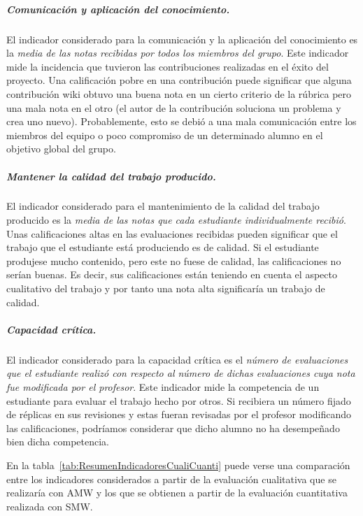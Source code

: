 			\subparagraph*{Comunicación y aplicación del conocimiento.}
			El indicador considerado para la comunicación y la aplicación del conocimiento es la \emph{media de las notas recibidas por todos los miembros del grupo}. Este indicador mide la incidencia que tuvieron las contribuciones realizadas en el éxito del proyecto. Una calificación pobre en una contribución puede significar  que alguna contribución wiki obtuvo una buena nota en un cierto criterio de la rúbrica pero una mala nota en el otro (el autor de la contribución soluciona un problema y crea uno nuevo). Probablemente, esto se debió a una mala comunicación entre los miembros del equipo o poco compromiso de un determinado alumno en el objetivo global del grupo. 

			\subparagraph*{Mantener la calidad del trabajo producido.}
			El indicador considerado para el mantenimiento de la calidad del trabajo producido es la \emph{media de las notas que cada estudiante individualmente recibió}. Unas calificaciones altas en las evaluaciones recibidas pueden significar que el trabajo que el estudiante está produciendo es de calidad. Si el estudiante produjese mucho contenido, pero este no fuese de calidad, las calificaciones no serían buenas. Es decir, sus calificaciones están teniendo en cuenta el aspecto cualitativo del trabajo y por tanto una nota alta significaría un trabajo de calidad.

			\subparagraph*{Capacidad crítica.}
			El indicador considerado para la capacidad crítica es el \emph{número de evaluaciones que el estudiante realizó con respecto al número de dichas evaluaciones cuya nota fue modificada por el profesor}. Este indicador mide la competencia de un estudiante para evaluar el trabajo hecho por otros. Si recibiera un número fijado de réplicas en sus revisiones y estas fueran revisadas por el profesor modificando las calificaciones, podríamos considerar que dicho alumno no ha desempeñado bien dicha competencia.

			En la tabla~\ref{tab:ResumenIndicadoresCualiCuanti} puede verse una comparación entre los indicadores considerados a partir de la evaluación cualitativa que se realizaría con AMW y los que se obtienen a partir de la evaluación cuantitativa realizada con SMW.

